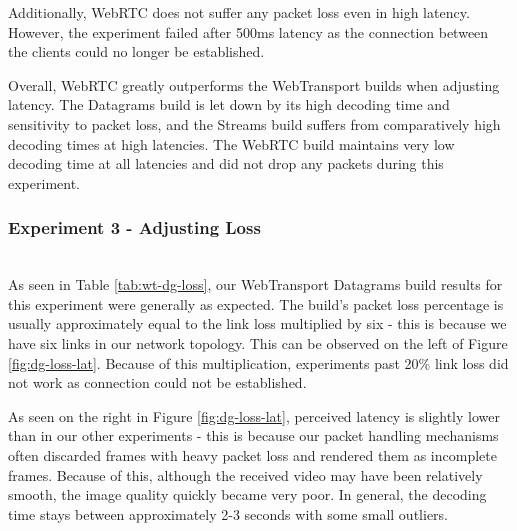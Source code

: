 Additionally, WebRTC does not suffer any packet loss even in high latency. However, the experiment failed after 500ms latency as the connection between the clients could no longer be established.

Overall, WebRTC greatly outperforms the WebTransport builds when adjusting latency. The Datagrams build is let down by its high decoding time and sensitivity to packet loss, and the Streams build suffers from comparatively high decoding times at high latencies. The WebRTC build maintains very low decoding time at all latencies and did not drop any packets during this experiment.
\hfill{} \\
\subsubsection{Experiment 3 - Adjusting Loss} 
\hfill{} \\
As seen in Table \ref{tab:wt-dg-loss}, our WebTransport Datagrams build results for this experiment were generally as expected. The build's packet loss percentage is usually approximately equal to the link loss multiplied by six - this is because we have six links in our network topology. This can be observed on the left of Figure \ref{fig:dg-loss-lat}. Because of this multiplication, experiments past 20\% link loss did not work as connection could not be established. 


As seen on the right in Figure \ref{fig:dg-loss-lat}, perceived latency is slightly lower than in our other experiments - this is because our packet handling mechanisms often discarded frames with heavy packet loss and rendered them as incomplete frames. Because of this, although the received video may have been relatively smooth, the image quality quickly became very poor. In general, the decoding time stays between approximately 2-3 seconds with some small outliers.


